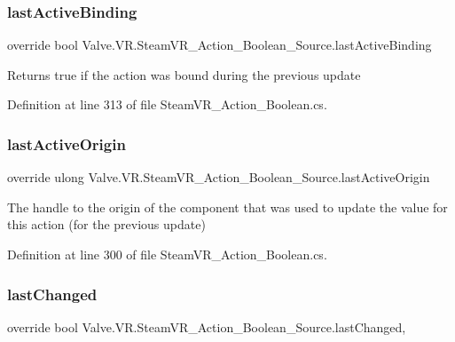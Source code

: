 \subsubsection{\texorpdfstring{lastActiveBinding}{lastActiveBinding}}
{\footnotesize\ttfamily override bool Valve.\+V\+R.\+Steam\+V\+R\+\_\+\+Action\+\_\+\+Boolean\+\_\+\+Source.\+last\+Active\+Binding\hspace{0.3cm}{\ttfamily [get]}}



Returns true if the action was bound during the previous update 



Definition at line 313 of file Steam\+V\+R\+\_\+\+Action\+\_\+\+Boolean.\+cs.

\mbox{\label{class_valve_1_1_v_r_1_1_steam_v_r___action___boolean___source_ad73216cbbb3caf2c1f42d736e86b7474}} 
\subsubsection{\texorpdfstring{lastActiveOrigin}{lastActiveOrigin}}
{\footnotesize\ttfamily override ulong Valve.\+V\+R.\+Steam\+V\+R\+\_\+\+Action\+\_\+\+Boolean\+\_\+\+Source.\+last\+Active\+Origin\hspace{0.3cm}{\ttfamily [get]}}



The handle to the origin of the component that was used to update the value for this action (for the previous update) 



Definition at line 300 of file Steam\+V\+R\+\_\+\+Action\+\_\+\+Boolean.\+cs.

\mbox{\label{class_valve_1_1_v_r_1_1_steam_v_r___action___boolean___source_a0d4b059215ef754084e98c6b342cfdfd}} 
\subsubsection{\texorpdfstring{lastChanged}{lastChanged}}
{\footnotesize\ttfamily override bool Valve.\+V\+R.\+Steam\+V\+R\+\_\+\+Action\+\_\+\+Boolean\+\_\+\+Source.\+last\+Changed\hspace{0.3cm}{\ttfamily [get]}, {}}



